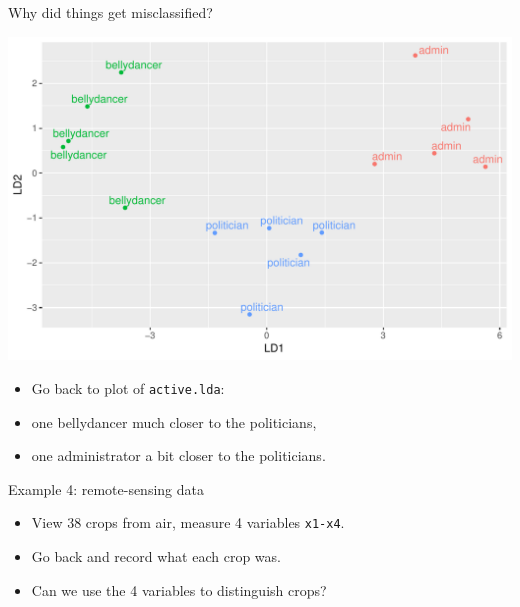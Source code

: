 \begin{frame}[fragile]{Why did things get misclassified?}

  \begin{minipage}[t]{0.7\linewidth}
\begin{knitrout}
\color{fgcolor}\begin{kframe}
\begin{alltt}
\end{alltt}
\end{kframe}
\includegraphics[width=\maxwidth]{figure/nesta-1} 

\end{knitrout}
  \end{minipage}
  \begin{minipage}[t]{0.28\linewidth}
    \begin{itemize}
    \item Go back to plot of \texttt{active.lda}:
    \item one bellydancer much closer to the politicians,
    \item one administrator a bit closer to the politicians.
    \end{itemize}
  \end{minipage}
  
  

  
\end{frame}


\begin{frame}[fragile]{Example 4: remote-sensing data}

  \begin{itemize}
  \item View 38 crops from air, measure 4 variables \verb=x1-x4=.
  \item Go back and record what each crop was.
  \item Can we use the 4 variables to distinguish crops?
  \end{itemize}
\end{frame}

